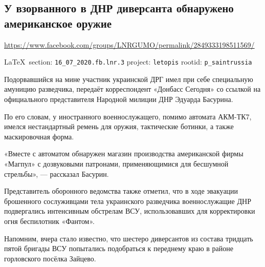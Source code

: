 
 
\subsection{У взорванного в ДНР диверсанта обнаружено американское оружие}
\label{sec:16_07_2020.fb.lnr.3}
\url{https://www.facebook.com/groups/LNRGUMO/permalink/2849333198511569/}
  
\vspace{0.5cm}
{\ifDEBUG\small\LaTeX~section: \verb|16_07_2020.fb.lnr.3| project: \verb|letopis| rootid: \verb|p_saintrussia|\fi}
\vspace{0.5cm}
  
Подорвавшийся на мине участник украинской ДРГ имел при себе специальную амуницию разведчика, передаёт корреспондент «Донбасс Сегодня» со ссылкой на официального представителя Народной милиции ДНР Эдуарда Басурина.

По его словам, у иностранного военнослужащего, помимо автомата АКМ-ТК7, имелся нестандартный ремень для оружия, тактические ботинки, а также маскировочная форма.

«Вместе с автоматом обнаружен магазин производства американской фирмы «Магпул» с дозвуковыми патронами, применяющимися для бесшумной стрельбы», --- рассказал Басурин.

Представитель оборонного ведомства также отметил, что в ходе эвакуации брошенного сослуживцами тела украинского разведчика военнослужащие ДНР подвергались интенсивным обстрелам ВСУ, использовавших для корректировки огня беспилотник «Фантом».

Напомним, вчера стало известно, что шестеро диверсантов из состава тридцать пятой бригады ВСУ попытались подобраться к переднему краю в районе горловского посёлка Зайцево.
